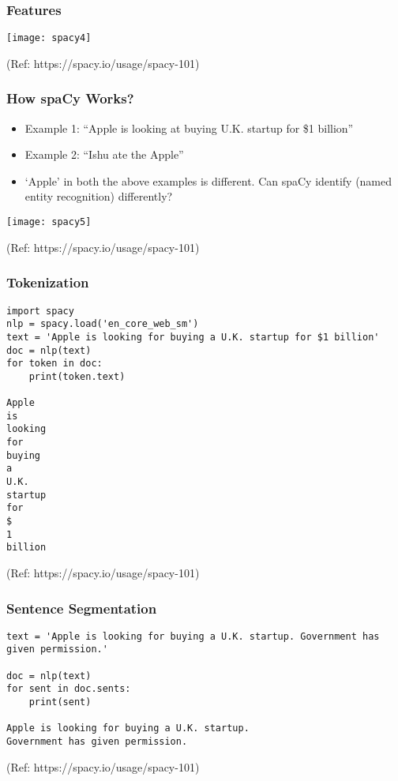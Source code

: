 \begin{frame}[fragile]\frametitle{Features}
\begin{center}
\texttt{[image: spacy4]}
\end{center}

{\tiny (Ref: https://spacy.io/usage/spacy-101)}
\end{frame}



\begin{frame}[fragile]\frametitle{How spaCy Works?}
  \begin{itemize}
    \item Example 1: ``Apple is looking at buying U.K. startup for \$1 billion''
		\item Example 2: ``Ishu ate the Apple''
		\item `Apple' in both the above examples is different. Can spaCy identify (named entity recognition) differently?
  \end{itemize}
	
\begin{center}
\texttt{[image: spacy5]}
\end{center}
	
{\tiny (Ref: https://spacy.io/usage/spacy-101)}
\end{frame}

\begin{frame}[fragile]\frametitle{Tokenization}

\begin{lstlisting}
import spacy
nlp = spacy.load('en_core_web_sm')
text = 'Apple is looking for buying a U.K. startup for $1 billion'
doc = nlp(text)
for token in doc:
    print(token.text)
		
Apple
is
looking
for
buying
a
U.K.
startup
for
$
1
billion
\end{lstlisting}
	
{\tiny (Ref: https://spacy.io/usage/spacy-101)}
\end{frame}


\begin{frame}[fragile]\frametitle{Sentence Segmentation}

\begin{lstlisting}
text = 'Apple is looking for buying a U.K. startup. Government has given permission.'

doc = nlp(text)
for sent in doc.sents:
    print(sent)
		
Apple is looking for buying a U.K. startup.
Government has given permission.
\end{lstlisting}
	
{\tiny (Ref: https://spacy.io/usage/spacy-101)}
\end{frame}

